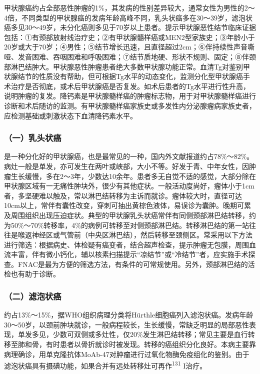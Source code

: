 甲状腺癌约占全部恶性肿瘤的1\%，其发病的性别差异较大，通常女性为男性的2～4倍，不同类型的甲状腺癌的发病年龄高峰不同，乳头状癌多在30～39岁，滤泡状癌多见30～49岁，未分化癌则多见于70岁以上患者。提示甲状腺恶性结节临床证据包括：①有颈部放射线治疗史；②有甲状腺髓样癌或MEN2型家族史；③年龄小于20岁或大于70岁；④男性；⑤结节增长迅速，且直径超过2cm；⑥伴持续性声音嘶哑、发音困难、吞咽困难和呼吸困难；⑦结节质地硬、形状不规则、固定；⑧伴颈部淋巴结肿大。甲状腺恶性肿瘤患者绝大多数甲状腺功能正常。血清Tg对鉴别甲状腺结节的性质没有帮助，但可根据Tg水平的动态变化，监测分化型甲状腺癌手术治疗是否彻底，或术后甲状腺癌是否复发。如术后患者的Tg水平进行性升高，说明肿瘤的复发。降钙素是甲状腺髓样癌的肿瘤标志物，用于对甲状腺髓样癌进行诊断和术后随访的监测。有甲状腺髓样癌家族史或多发性内分泌腺瘤病家族史者，应检测基础或刺激状态下血清降钙素水平。

\subsubsection{（一）乳头状癌}

是一种分化好的甲状腺癌，也是最常见的一种，国内外文献报道约占78\%～82\%。病灶一般是单发，亦可发生在两叶或峡部，大小不等。好发于青、中年女性，因肿瘤生长缓慢，多在2～3年，少数达10余年。患者多无自觉不适的感觉，大部分除在甲状腺区域有一无痛性肿块外，很少有其他症状。一般活动度尚好，瘤体小于1cm者，多坚硬难以触及，常以淋巴结转移为主诉而就诊。瘤体较大时，直径可达10cm以上，常伴有囊性改变，穿刺可抽出黄棕色液体，易误诊为囊肿。晚期可累及周围组织出现压迫症状。典型的甲状腺乳头状癌常伴有同侧颈部淋巴结转移，约为50\%～70\%转移率，4\%的病例可转移至对侧颈部淋巴结。转移淋巴结的第一站往往是喉返神经区或气管前（中央区淋巴结），然后转移至颈侧区。常采用以下方法进行筛选：根据病史、体检疑有癌变者，结合超声检查，提示肿瘤无包膜，周围血流丰富，伴有微小钙化，辅以核素扫描提示“凉结节”或“冷结节”者，应实施手术探查。FNAC是最为方便的筛选方法，有条件的可常规使用。另外，颈部淋巴结的活检也有助于诊断。

\subsubsection{（二）滤泡状癌}

约占13\%～15\%，据WHO组织病理分类将Hürthle细胞癌列入滤泡状癌。发病年龄30～50岁，以颈前肿块就诊，一般病程较长，生长缓慢，常缺乏明显的局部恶性表现，单发多见，少数可双侧或多灶性，仅20\%发生淋巴结转移；常见主要是血行转移至肺和骨，有时患者以骨折就诊时被发现。转移的癌组织分化良好。本病主要靠病理确诊，用单克隆抗体MoAb-47对肿瘤进行过氧化物酶免疫组化的鉴别。由于滤泡状癌具有摄碘功能，如果合并有远处转移灶可再作\textsuperscript{131}
I治疗。

